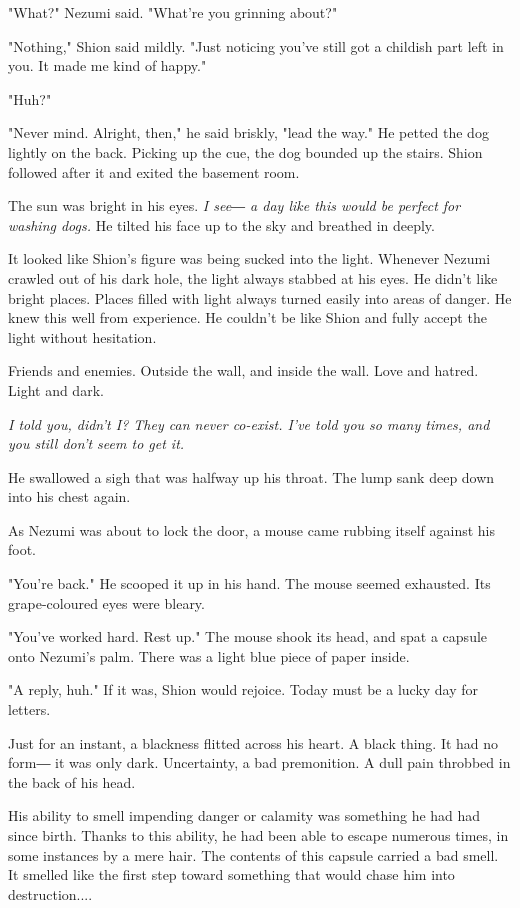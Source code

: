 "What?" Nezumi said. "What're you grinning about?"

"Nothing," Shion said mildly. "Just noticing you've still got a childish
part left in you. It made me kind of happy."

"Huh?"

"Never mind. Alright, then," he said briskly, "lead the way." He petted
the dog lightly on the back. Picking up the cue, the dog bounded up the
stairs. Shion followed after it and exited the basement room.

The sun was bright in his eyes.\emph{ I see― a day like this would be perfect
	for washing dogs.} He tilted his face up to the sky and breathed in
deeply.

\myspace

It looked like Shion's figure was being sucked into the light. Whenever
Nezumi crawled out of his dark hole, the light always stabbed at his
eyes. He didn't like bright places. Places filled with light always
turned easily into areas of danger. He knew this well from experience.
He couldn't be like Shion and fully accept the light without hesitation.

Friends and enemies. Outside the wall, and inside the wall. Love and
hatred. Light and dark.

\emph{I told you, didn't I? They can never co-exist. I've told you so many
	times, and you still don't seem to get it.}

He swallowed a sigh that was halfway up his throat. The lump sank deep
down into his chest again.

As Nezumi was about to lock the door, a mouse came rubbing itself
against his foot.

"You're back." He scooped it up in his hand. The mouse seemed exhausted.
Its grape-coloured eyes were bleary.

"You've worked hard. Rest up." The mouse shook its head, and spat a
capsule onto Nezumi's palm. There was a light blue piece of paper
inside.

"A reply, huh." If it was, Shion would rejoice. Today must be a lucky
day for letters.

Just for an instant, a blackness flitted across his heart. A black
thing. It had no form― it was only dark. Uncertainty, a bad premonition.
A dull pain throbbed in the back of his head.

His ability to smell impending danger or calamity was something he had
had since birth. Thanks to this ability, he had been able to escape
numerous times, in some instances by a mere hair. The contents of this
capsule carried a bad smell. It smelled like the first step toward
something that would chase him into destruction....

